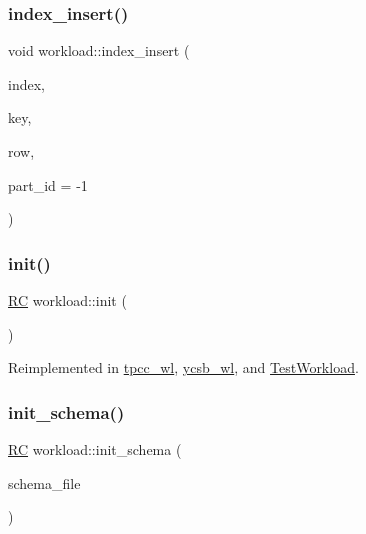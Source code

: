 \mbox{\label{classworkload_a9fb849d3df28fea4e00353f046c130a2}} 
\subsubsection{\texorpdfstring{index\+\_\+insert()}{index\_insert()}\hspace{0.1cm}{\footnotesize\ttfamily [2/2]}}
{\footnotesize\ttfamily void workload\+::index\+\_\+insert (\begin{DoxyParamCaption}\item[{\hyperlink{classIndex}{Index} $\ast$}]{index,  }\item[{uint64\+\_\+t}]{key,  }\item[{\hyperlink{classrow__t}{row\+\_\+t} $\ast$}]{row,  }\item[{int64\+\_\+t}]{part\+\_\+id = {\ttfamily -\/1} }\end{DoxyParamCaption})\hspace{0.3cm}{\ttfamily [protected]}}

\mbox{\label{classworkload_a7cef7a7101c78e10082c99356e77a57c}} 
\subsubsection{\texorpdfstring{init()}{init()}}
{\footnotesize\ttfamily \hyperlink{global_8h_a78c49a674c810fdd03d20432f7be864a}{RC} workload\+::init (\begin{DoxyParamCaption}{ }\end{DoxyParamCaption})\hspace{0.3cm}{\ttfamily [virtual]}}



Reimplemented in \hyperlink{classtpcc__wl_a084aa9016fbc3abbb278f1c4bd15722c}{tpcc\+\_\+wl}, \hyperlink{classycsb__wl_ab457878c0f802cbbbf9ff27979e0eda6}{ycsb\+\_\+wl}, and \hyperlink{classTestWorkload_aba95b44e0531c1ff81d9846bcd7df8ba}{Test\+Workload}.

\mbox{\label{classworkload_a12ce1550f8e398871961c6ff116c11d3}} 
\subsubsection{\texorpdfstring{init\+\_\+schema()}{init\_schema()}}
{\footnotesize\ttfamily \hyperlink{global_8h_a78c49a674c810fdd03d20432f7be864a}{RC} workload\+::init\+\_\+schema (\begin{DoxyParamCaption}\item[{std\+::string}]{schema\+\_\+file }\end{DoxyParamCaption})\hspace{0.3cm}{\ttfamily [virtual]}}



